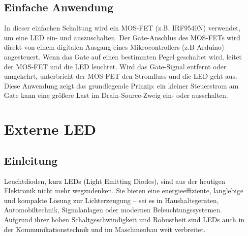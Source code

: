 \subsection{Einfache Anwendung}
In dieser einfachen Schaltung wird ein MOS-FET (z.B. IRF9540N) verwendet, um eine LED ein- und auszuschalten. Der Gate-Anschlus des MOS-FETs wird direkt von einem digitalen Ausgang eines Mikrocontrollers (z.B Arduino) angesteuert. Wenn das Gate auf einen bestimmten Pegel geschaltet wird, leitet der MOS-FET und die LED leuchtet. Wird das Gate-Signal entfernt oder umgekehrt, unterbricht der MOS-FET den Stromfluss und die LED geht aus. Diese Anwendung zeigt das grundlegende Prinzip: ein kleiner Steuerstrom am Gate kann eine größere Last im Drain-Source-Zweig ein- oder ausschalten. 
\begin{code}[H]
	\caption{Einfache Anwendung zum Verwenden des MOS-FETs}
	\label{code:AnwendungMOSFET}
\end{code}

\section{Externe LED}
\subsection{Einleitung}
Leuchtdioden, kurz LEDs (Light Emitting Diodes), sind aus der heutigen Elektronik nicht mehr wegzudenken. Sie bieten eine energieeffiziente, langlebige und kompakte Lösung zur Lichterzeugung – sei es in Haushaltsgeräten, Automobiltechnik, Signalanlagen oder modernen Beleuchtungssystemen. Aufgrund ihrer hohen Schaltgeschwindigkeit und Robustheit sind LEDs auch in der Kommunikationstechnik und im Maschinenbau weit verbreitet. \cite{Haeberle:2018} \cite{Hering:2024}

